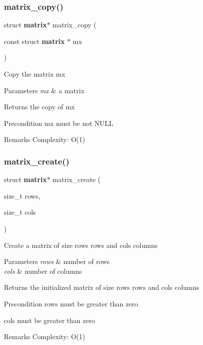 \subsubsection{matrix\+\_\+copy()}
{\footnotesize\ttfamily struct \textbf{ matrix}$\ast$ matrix\+\_\+copy (\begin{DoxyParamCaption}\item[{const struct \textbf{ matrix} $\ast$}]{mx }\end{DoxyParamCaption})}

Copy the matrix {\ttfamily mx}


\begin{DoxyParams}{Parameters}
{\em mx} & a matrix \\
\hline
\end{DoxyParams}
\begin{DoxyReturn}{Returns}
the copy of {\ttfamily mx}
\end{DoxyReturn}
\begin{DoxyPrecond}{Precondition}
{\ttfamily mx} must be not N\+U\+LL
\end{DoxyPrecond}
\begin{DoxyRemark}{Remarks}
Complexity\+: O(1) 
\end{DoxyRemark}
\mbox{\label{matrix_8c_ad2d40d9c13eba774d6bb788021242a95}} 
\subsubsection{matrix\+\_\+create()}
{\footnotesize\ttfamily struct \textbf{ matrix}$\ast$ matrix\+\_\+create (\begin{DoxyParamCaption}\item[{size\+\_\+t}]{rows,  }\item[{size\+\_\+t}]{cols }\end{DoxyParamCaption})}

Create a matrix of size {\ttfamily rows} rows and {\ttfamily cols} columns


\begin{DoxyParams}{Parameters}
{\em rows} & number of rows \\
\hline
{\em cols} & number of columns\\
\hline
\end{DoxyParams}
\begin{DoxyReturn}{Returns}
the initialized matrix of size {\ttfamily rows} rows and {\ttfamily cols} columns
\end{DoxyReturn}
\begin{DoxyPrecond}{Precondition}
{\ttfamily rows} must be greater than zero 

{\ttfamily cols} must be greater than zero
\end{DoxyPrecond}
\begin{DoxyRemark}{Remarks}
Complexity\+: O(1) 
\end{DoxyRemark}
\mbox{\label{matrix_8c_a268a5429e2e4bc1664045624a82bc09c}} 
